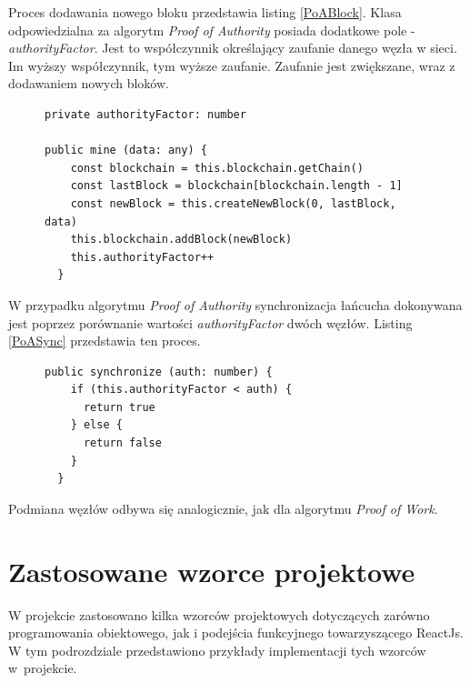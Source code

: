 \documentclass[a4paper,12pt]{book}
\begin{document}
Proces dodawania nowego bloku przedstawia listing \ref{PoABlock}. Klasa odpowiedzialna za algorytm \textit{Proof of Authority} posiada dodatkowe pole - \textit{authorityFactor}. Jest to współczynnik określający zaufanie danego węzła w sieci. Im wyższy współczynnik, tym wyższe zaufanie. Zaufanie jest zwiększane, wraz z dodawaniem nowych bloków.
 
\begin{figure}  
  \centering
\begin{lstlisting}[style=ES6, caption={Dodawanie nowego bloku w algorytmie Proof of Authority.}, label={PoABlock}]
private authorityFactor: number

public mine (data: any) {
    const blockchain = this.blockchain.getChain()
    const lastBlock = blockchain[blockchain.length - 1]
    const newBlock = this.createNewBlock(0, lastBlock, data)
    this.blockchain.addBlock(newBlock)
    this.authorityFactor++
  }
\end{lstlisting}
\end{figure}
W przypadku algorytmu \textit{Proof of Authority} synchronizacja łańcucha dokonywana jest poprzez porównanie wartości \textit{authorityFactor} dwóch węzłów. Listing \ref{PoASync} przedstawia ten proces.

\begin{figure}  
  \centering
\begin{lstlisting}[style=ES6, caption={Synchronizacja w algorytmi Proof of Authority.}, label={PoASync}]
public synchronize (auth: number) {
    if (this.authorityFactor < auth) {
      return true
    } else {
      return false
    }
  }
\end{lstlisting}
\end{figure}
Podmiana węzłów odbywa się analogicznie, jak dla algorytmu \textit{Proof of Work}.


\section{Zastosowane wzorce projektowe}
W projekcie zastosowano kilka wzorców projektowych dotyczących zarówno programowania obiektowego, jak i podejścia funkcyjnego towarzyszącego ReactJs. W tym podrozdziale przedstawiono przykłady implementacji tych wzorców w~projekcie.
\end{document}
